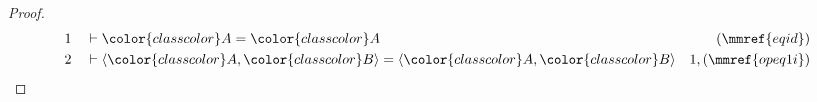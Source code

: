 \begin{proof}
\begin{align}
  1 && & \vdash {\color{classcolor}A} =
      {\color{classcolor}A}&(\mmref{eqid})\notag
  \\ 2 && & \vdash \langle {\color{classcolor}A} , {\color{classcolor}B}
      \rangle = \langle {\color{classcolor}A} ,
      {\color{classcolor}B}
      \rangle&1,(\mmref{opeq1i})\notag
\end{align}
\end{proof}

